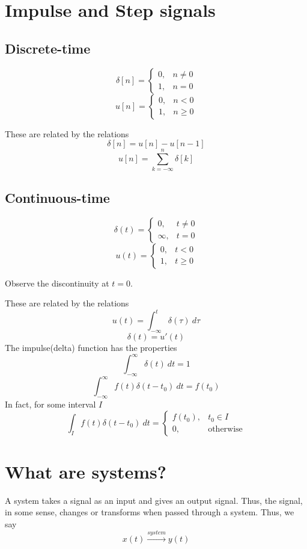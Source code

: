 \documentclass[10pt, a4paper]{extarticle}
\theoremstyle{definition}
\begin{document}
	\section{Impulse and Step signals}
	\subsection{Discrete-time}
	\[\delta[n]= \begin{cases}
      0, & n\neq 0 \\
      1, & n= 0 
      \end{cases}\]
	  \[u[n]= \begin{cases} 
      0, & n< 0 \\
      1, & n\geq 0 
      \end{cases}\]

	  These are related by the relations
	  \[\delta[n]=u[n]-u[n-1]\]
	  \[u[n]=\sum_{k=-\infty}^n\delta[k]\]
	  

	  \subsection{Continuous-time}
	\[\delta(t)= \begin{cases}
      0, & t\neq 0 \\
      \infty, & t= 0 
      \end{cases}\]
	  \[u(t)= \begin{cases} 
      0, & t< 0 \\
      1, & t\geq 0 
      \end{cases}\]

	  Observe the discontinuity at $t=0$.

	  These are related by the relations
	  \[u(t)=\int_{-\infty}^{t}\delta(\tau)\ d\tau\]
	  \[\delta(t)=u'(t)\]
	  The impulse(delta) function has the properties
	  \[\int_{-\infty}^{\infty}\delta(t)\ dt=1\]
	  \[\int_{-\infty}^{\infty}f(t)\delta(t-t_0)\ dt=f(t_0)\]
	  In fact, for some interval $I$
	  \[\int_{I}f(t)\delta(t-t_0)\ dt=\begin{cases}
		f(t_0),& t_0\in I\\
		0, & \text{otherwise}
	  \end{cases}\]

	  \section{What are systems?}
	  A system takes a signal as an input and gives an output signal. Thus, the signal, in some sense, changes or transforms when passed through a system.
	  Thus, we say
	  \[x(t)\xrightarrow{system}y(t)\]
\end{document}

